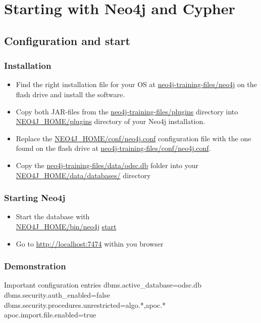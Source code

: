 \documentclass[12pt]{beamer}
\begin{document}
    \section{Starting with Neo4j and Cypher}
    \subsection{Configuration and start}
    \begin{frame}
        \frametitle{Installation}
        \begin{itemize}
            \item Find the right installation file for your OS at \url{neo4j-training-files/neo4j} on the flash drive and install the software.
            \pause
            \item Copy both JAR-files from the \url{neo4j-training-files/plugins} directory into \url{NEO4J_HOME/plugins} directory of your Neo4j installation.
            \pause
            \item Replace the \url{NEO4J_HOME/conf/neo4j.conf} configuration file with the one found on the flash drive at \url{neo4j-training-files/conf/neo4j.conf}.
            \pause
            \item Copy the \url{neo4j-training-files/data/odsc.db} folder into your \url{NEO4J_HOME/data/databases/} directory
        \end{itemize}
    \end{frame}
    
    \begin{frame}
        \frametitle{Starting Neo4j}
        \begin{itemize}
            \item Start the database with\\
            \url{NEO4J_HOME/bin/neo4j} \url{start}
            \pause
            \item Go to \url{http://localhost:7474} within you browser
        \end{itemize}
    \end{frame}
    
    \begin{frame}
        \frametitle{Demonstration}
        \begin{block}{Important configuration entries}
            dbms.active\_database=odsc.db\\
            dbms.security.auth\_enabled=false\\
            dbms.security.procedures.unrestricted=algo.*,apoc.*\\
            apoc.import.file.enabled=true
        \end{block}
    \end{frame}
    
\end{document}
